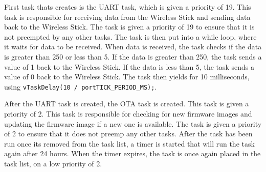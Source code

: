 First task thats creates is the UART task, which is given a priority of 19. This task is responsible for receiving data from the Wireless Stick and sending data back to the Wireless Stick. The task is given a priority of 19 to ensure that it is not preempted by any other tasks. The task is then put into a while loop, where it waits for data to be received. When data is received, the task checks if the data is greater than 250 or less than 5. If the data is greater than 250, the task sends a value of 1 back to the Wireless Stick. If the data is less than 5, the task sends a value of 0 back to the Wireless Stick. The task then yields for 10 milliseconds, using \texttt{vTaskDelay(10 / portTICK\_PERIOD\_MS);}.

After the UART task is created, the OTA task is created. This task is given a priority of 2. This task is responsible for checking for new firmware images and updating the firmware image if a new one is available. The task is given a priority of 2 to ensure that it does not preemp any other tasks. After the task has been run once its removed from the task list, a timer is started that will run the task again after 24 hours. When the timer expires, the task is once again placed in the task list, on a low priority of 2.
